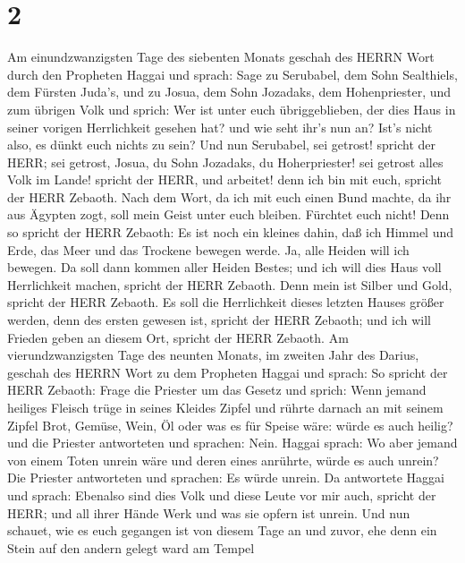 \hypertarget{section-1}{%
\section{2}\label{section-1}}

 Am einundzwanzigsten Tage des siebenten Monats geschah des
HERRN Wort durch den Propheten Haggai und sprach:  Sage zu
Serubabel, dem Sohn Sealthiels, dem Fürsten Juda's, und zu Josua, dem
Sohn Jozadaks, dem Hohenpriester, und zum übrigen Volk und sprich:
 Wer ist unter euch übriggeblieben, der dies Haus in seiner
vorigen Herrlichkeit gesehen hat? und wie seht ihr's nun an? Ist's nicht
also, es dünkt euch nichts zu sein?  Und nun Serubabel, sei
getrost! spricht der HERR; sei getrost, Josua, du Sohn Jozadaks, du
Hoherpriester! sei getrost alles Volk im Lande! spricht der HERR, und
arbeitet! denn ich bin mit euch, spricht der HERR Zebaoth. 
Nach dem Wort, da ich mit euch einen Bund machte, da ihr aus Ägypten
zogt, soll mein Geist unter euch bleiben. Fürchtet euch nicht!
 Denn so spricht der HERR Zebaoth: Es ist noch ein kleines
dahin, daß ich Himmel und Erde, das Meer und das Trockene bewegen werde.
 Ja, alle Heiden will ich bewegen. Da soll dann kommen aller
Heiden Bestes; und ich will dies Haus voll Herrlichkeit machen, spricht
der HERR Zebaoth.  Denn mein ist Silber und Gold, spricht
der HERR Zebaoth.  Es soll die Herrlichkeit dieses letzten
Hauses größer werden, denn des ersten gewesen ist, spricht der HERR
Zebaoth; und ich will Frieden geben an diesem Ort, spricht der HERR
Zebaoth.  Am vierundzwanzigsten Tage des neunten Monats, im
zweiten Jahr des Darius, geschah des HERRN Wort zu dem Propheten Haggai
und sprach:  So spricht der HERR Zebaoth: Frage die
Priester um das Gesetz und sprich:  Wenn jemand heiliges
Fleisch trüge in seines Kleides Zipfel und rührte darnach an mit seinem
Zipfel Brot, Gemüse, Wein, Öl oder was es für Speise wäre: würde es auch
heilig? und die Priester antworteten und sprachen: Nein. 
Haggai sprach: Wo aber jemand von einem Toten unrein wäre und deren
eines anrührte, würde es auch unrein? Die Priester antworteten und
sprachen: Es würde unrein.  Da antwortete Haggai und
sprach: Ebenalso sind dies Volk und diese Leute vor mir auch, spricht
der HERR; und all ihrer Hände Werk und was sie opfern ist unrein.
 Und nun schauet, wie es euch gegangen ist von diesem Tage
an und zuvor, ehe denn ein Stein auf den andern gelegt ward am Tempel
